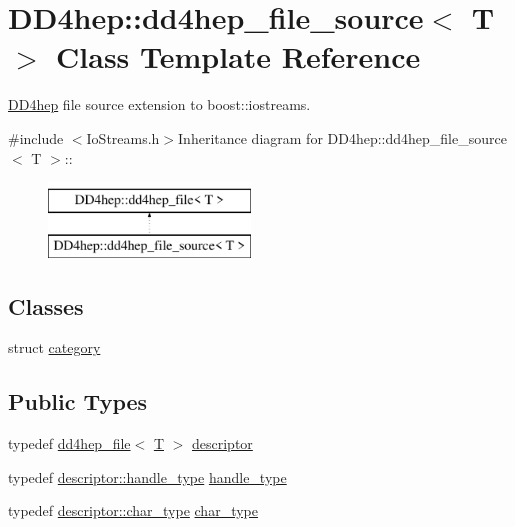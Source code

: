 \hypertarget{class_d_d4hep_1_1dd4hep__file__source}{
\section{DD4hep::dd4hep\_\-file\_\-source$<$ T $>$ Class Template Reference}
\label{class_d_d4hep_1_1dd4hep__file__source}
}


\hyperlink{namespace_d_d4hep}{DD4hep} file source extension to boost::iostreams.  


{\ttfamily \#include $<$IoStreams.h$>$}Inheritance diagram for DD4hep::dd4hep\_\-file\_\-source$<$ T $>$::\begin{figure}[H]
\begin{center}
\leavevmode
\includegraphics[height=2cm]{class_d_d4hep_1_1dd4hep__file__source}
\end{center}
\end{figure}
\subsection*{Classes}
\begin{DoxyCompactItemize}
\item 
struct \hyperlink{struct_d_d4hep_1_1dd4hep__file__source_1_1category}{category}
\end{DoxyCompactItemize}
\subsection*{Public Types}
\begin{DoxyCompactItemize}
\item 
typedef \hyperlink{class_d_d4hep_1_1dd4hep__file}{dd4hep\_\-file}$<$ \hyperlink{class_t}{T} $>$ \hyperlink{class_d_d4hep_1_1dd4hep__file__source_acd7bec0e43b763cf692f18ce75a4dba8}{descriptor}
\item 
typedef \hyperlink{class_t}{descriptor::handle\_\-type} \hyperlink{class_d_d4hep_1_1dd4hep__file__source_abdabe1da6c2a2b2297dc86f41368c234}{handle\_\-type}
\item 
typedef \hyperlink{class_d_d4hep_1_1dd4hep__file_aef4242f7f2fe15a59f7bf7a8f6ba24d5}{descriptor::char\_\-type} \hyperlink{class_d_d4hep_1_1dd4hep__file__source_ad18eef60f1b38b5958eec9f287dac85a}{char\_\-type}
\end{DoxyCompactItemize}
